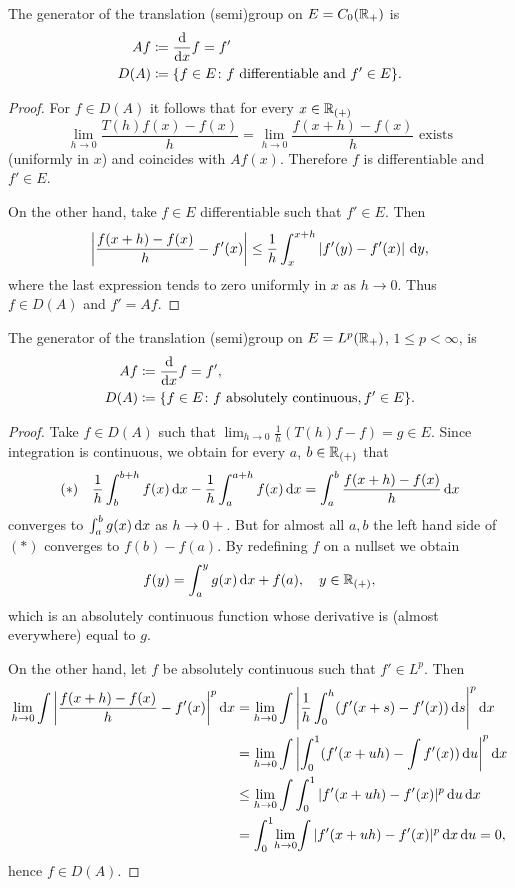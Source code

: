 The generator of the translation (semi)group on $E = C_{0}(\mathbb{R}_{+})$ is 
\begin{align*}
    Af & \coloneqq \frac{\mathop{}\!\mathrm{d}{}}{\mathop{}\!\mathrm{d}{x}}f = f' \\
    D(A) &\coloneqq \{f \in E \colon f \text{ differentiable and } f' \in E\}.
\end{align*}
\begin{proof}
For $f \in D(A)$ it follows that for every $x \in \mathbb{R}_{(+)}$
\[
    \lim_{h \to 0} \frac{T(h)f(x) - f(x)}{h} = \lim_{h \to 0} \frac{f(x+h) - f(x)}{h} \text{ exists}
\]
(uniformly in $x$) and coincides with $Af(x)$.
Therefore $f$ is differentiable and $f' \in E$.

On the other hand, take $f \in E$ differentiable such that $f' \in E$.
Then
\[
    \left|\frac{f(x+h) - f(x)}{h} - f'(x)\right| \leq \frac{1}{h}\int_{x}^{x+h}|f'(y) - f'(x)|\,\mathop{}\!\mathrm{d}{y},
\]
where the last expression tends to zero uniformly in $x$ as $h \to 0$.
Thus $f \in D(A)$ and $f' = Af$.
\end{proof}
The generator of the translation (semi)group on $E = L^{p}(\mathbb{R}_{+})$, $1 \leq p < \infty$, is
\begin{align*}
    Af &\coloneqq \frac{\mathop{}\!\mathrm{d}{}}{\mathop{}\!\mathrm{d}{x}}f = f', \\
    D(A) &\coloneqq \{f \in E \colon f \text{ absolutely continuous}, f' \in E\}.
\end{align*}
\begin{proof}
Take $f \in D(A)$ such that $\lim_{h \to 0} \frac{1}{h}(T(h)f - f) = g \in E$.
Since integration is continuous, we obtain for every $a$, $b \in \mathbb{R}_{(+)}$ that
\begin{equation*}\label{eq:a1-2.1}
(*) \quad \frac{1}{h}\int_{b}^{b+h} f(x) \mathop{}\!\mathrm{d}{x} - \frac{1}{h}\int_{a}^{a+h} f(x) \mathop{}\!\mathrm{d}{x} = \int_{a}^{b} \frac{f(x+h) - f(x)}{h} \mathop{}\!\mathrm{d}{x}
\end{equation*}
converges to $\int_{a}^{b} g(x) \mathop{}\!\mathrm{d}{x}$ as $h \to 0+$.
But for almost all $a, b$ the left hand side of $(*)$ converges to $f(b) - f(a)$.
By redefining $f$ on a nullset we obtain
\[
    f(y) = \int_{a}^{y} g(x)\mathop{}\!\mathrm{d}{x} + f(a), \quad y \in \mathbb{R}_{(+)},
\]
which is an absolutely continuous function whose derivative is (almost everywhere) equal to $g$.

On the other hand, let $f$ be absolutely continuous such that $f' \in L^{p}$.
Then
\begin{align*}
    \lim_{h \to 0} \int{\left|\frac{f(x+h) - f(x)}{h} - f'(x)\right|^{p} \dx} 
    &= \lim_{h \to 0} \int {\left|\frac{1}{h}\int_{0}^{h} (f'(x+s) - f'(x)) \ds\right|^{p} \dx }\\
    &= \lim_{h \to 0} \int {\left|\int_{0}^{1} (f'(x+uh) -  \int f'(x)) \du\right|^{p} \dx }\\
    &\leq \lim_{h \to 0}{ \int \int_{0}^{1} |f'(x+uh) - f'(x)|^p \du \dx }\\
    & = {\int_{0}^{1}} \displaystyle{\lim_{h \to 0}} {\int|f'(x+uh) - f'(x)|^{p} \dx \du = 0},
\end{align*}
hence $f \in D(A)$.
\end{proof}
